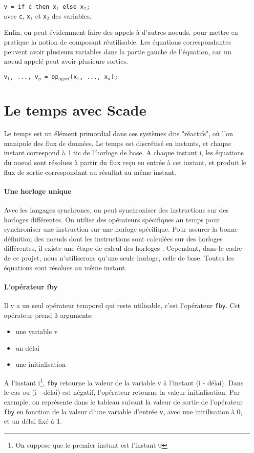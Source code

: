 \texttt{v = if c then x$_1$ else x$_2$;}\\
avec \texttt{c}, \texttt{x$_1$} et \texttt{x$_2$} des variables. 

Enfin, on peut évidemment faire des appels à d'autres
noeuds, pour mettre en pratique la notion de composant
réutilisable. Les équations correspondantes peuvent avoir plusieurs
variables dans la partie gauche de l'équation, car un noeud appelé
peut avoir plusieurs sorties.

\texttt{v$_1$, ..., v$_p$ = op$_{appel}$(x$_1$, ..., x$_n$);}




\section{Le temps avec Scade}

Le temps est un élément primordial dans ces systèmes dits "réactifs", où
l'on manipule des flux de données. Le temps est discrétisé en instants,
et chaque instant correspond à 1 tic de l'horloge de base. A chaque
instant i, les équations du noeud sont résolues à partir du flux reçu
en entrée à cet instant, et produit le flux de sortie correspondant au
résultat au même instant.

\paragraph{Une horloge unique}
Avec les langages synchrones, on peut
synchroniser des instructions sur des horloges différentes. On utilise des
opérateurs spécifiques au temps pour synchroniser une instruction sur une
horloge spécifique. Pour assurer la bonne définition des noeuds dont les
instructions sont calculées sur des horloges différentes, il existe
une étape de calcul des horloges \cite{Pouzet}.
Cependant, dans le cadre de ce projet, nous n'utiliserons qu'une seule horloge,
celle de base. Toutes les équations sont résolues au même instant. 

\paragraph{L'opérateur fby}
Il y a un seul opérateur temporel qui reste utilisable, c'est
l'opérateur \texttt{fby}. Cet opérateur prend 3 arguments:
\begin{itemize}
\item une variable v
\item un délai
\item une initialisation
\end{itemize}
A l'instant i\footnote{On suppose que le premier instant est l'instant
0}, \texttt{fby} retourne la valeur de la variable v à
l'instant (i - délai). Dans le cas ou (i - délai) est négatif,
l'opérateur retourne la valeur initialisation.
Par exemple, on représente dans le tableau suivant la valeur de sortie
de l'opérateur \texttt{fby} en fonction de la valeur d'une variable
d'entrée \texttt{v}, avec une initilisation à 0, et un délai fixé à 1.

